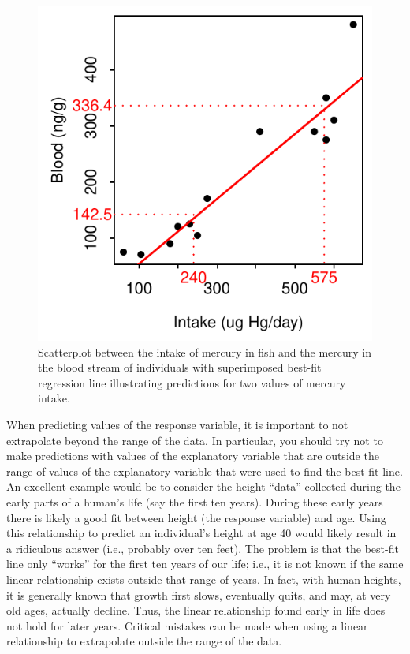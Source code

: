 \documentclass[10pt,openany]{book}\usepackage[]{graphicx}\usepackage[]{color}
\newenvironment{knitrout}{}{} %
\begin{document}
\begin{knitrout}
\color{fgcolor}\begin{figure}[hbtp]

{\centering \includegraphics[width=.4\linewidth]{Figs/HGpredict-1} 

}

\caption[Scatterplot between the intake of mercury in fish and the mercury in the blood stream of individuals with superimposed best-fit regression line illustrating predictions for two values of mercury intake]{Scatterplot between the intake of mercury in fish and the mercury in the blood stream of individuals with superimposed best-fit regression line illustrating predictions for two values of mercury intake.}\label{fig:HGpredict}
\end{figure}


\end{knitrout}


\vspace{-12pt}

When predicting values of the response variable, it is important to not extrapolate beyond the range of the data.  In particular, you should try not to make predictions with values of the explanatory variable that are outside the range of values of the explanatory variable that were used to find the best-fit line.  An excellent example would be to consider the height ``data'' collected during the early parts of a human's life (say the first ten years).  During these early years there is likely a good fit between height (the response variable) and age.  Using this relationship to predict an individual's height at age 40 would likely result in a ridiculous answer (i.e., probably over ten feet).  The problem is that the best-fit line only ``works'' for the first ten years of our life; i.e., it is not known if the same linear relationship exists outside that range of years.  In fact, with human heights, it is generally known that growth first slows, eventually quits, and may, at very old ages, actually decline.  Thus, the linear relationship found early in life does not hold for later years.  Critical mistakes can be made when using a linear relationship to extrapolate outside the range of the data.
\end{document}
